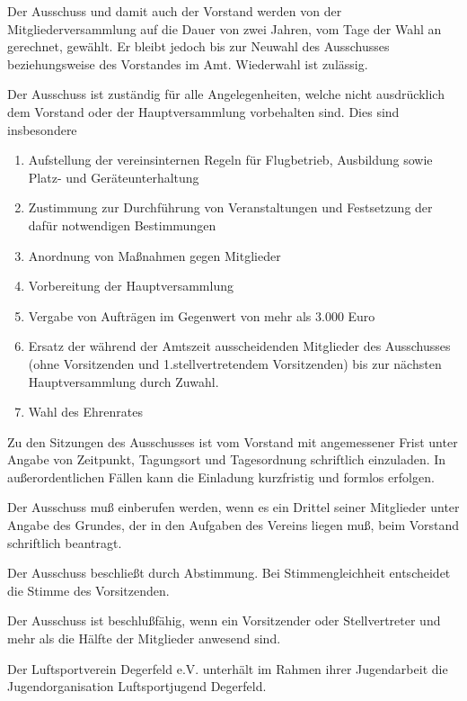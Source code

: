\documentclass[10pt,a4paper,parskip=half]{scrartcl}
\begin{document}
\begin{contract}
    Der Ausschuss und damit auch der Vorstand werden von der Mitgliederversammlung auf die Dauer von zwei Jahren,
    vom Tage der Wahl an gerechnet, gewählt.
    Er bleibt jedoch bis zur Neuwahl des Ausschusses beziehungsweise des Vorstandes im Amt.
    Wiederwahl ist zulässig.
    
    Der Ausschuss ist zuständig für alle Angelegenheiten,
    welche nicht ausdrücklich dem Vorstand oder der Hauptversammlung vorbehalten sind.
    Dies sind insbesondere
    \begin{enumerate}[label=\alph*),noitemsep]
      \item Aufstellung der vereinsinternen Regeln für Flugbetrieb,
            Ausbildung sowie Platz- und Geräteunterhaltung
      \item Zustimmung zur Durchführung von Veranstaltungen und Festsetzung der dafür notwendigen Bestimmungen
      \item Anordnung von Maßnahmen gegen Mitglieder
      \item Vorbereitung der Hauptversammlung
      \item Vergabe von Aufträgen im Gegenwert von mehr als 3.000 Euro
      \item Ersatz der während der Amtszeit ausscheidenden Mitglieder des Ausschusses (ohne Vorsitzenden und 1.stellvertretendem Vorsitzenden) bis zur nächsten Hauptversammlung durch Zuwahl.
      \item Wahl des Ehrenrates
    \end{enumerate}
    
    Zu den Sitzungen des Ausschusses ist vom Vorstand mit angemessener Frist unter Angabe von Zeitpunkt,
    Tagungsort und Tagesordnung schriftlich einzuladen.
    In außerordentlichen Fällen kann die Einladung kurzfristig und formlos erfolgen.
    
    Der Ausschuss muß einberufen werden,
    wenn es ein Drittel seiner Mitglieder unter Angabe des Grundes,
    der in den Aufgaben des Vereins liegen muß,
    beim Vorstand schriftlich beantragt.
    
    Der Ausschuss beschließt durch Abstimmung.
    Bei Stimmengleichheit entscheidet die Stimme des Vorsitzenden.
    
    Der Ausschuss ist beschlußfähig,
    wenn ein Vorsitzender oder Stellvertreter und mehr als die Hälfte der Mitglieder anwesend sind.
    
    Der Luftsportverein Degerfeld e.V. unterhält im Rahmen ihrer Jugendarbeit die Jugendorganisation Luftsportjugend Degerfeld.
    

\end{contract}
\end{document}
